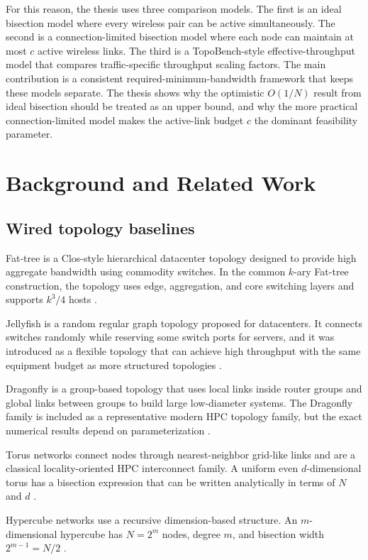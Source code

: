 \documentclass[conference]{IEEEtran}
\begin{document}
For this reason, the thesis uses three comparison models. The first is an ideal bisection model where every wireless pair can be active simultaneously. The second is a connection-limited bisection model where each node can maintain at most \(c\) active wireless links. The third is a TopoBench-style effective-throughput model that compares traffic-specific throughput scaling factors. The main contribution is a consistent required-minimum-bandwidth framework that keeps these models separate. The thesis shows why the optimistic \(O(1/N)\) result from ideal bisection should be treated as an upper bound, and why the more practical connection-limited model makes the active-link budget \(c\) the dominant feasibility parameter.

\section{Background and Related Work}

\subsection{Wired topology baselines}

Fat-tree is a Clos-style hierarchical datacenter topology designed to provide high aggregate bandwidth using commodity switches. In the common \(k\)-ary Fat-tree construction, the topology uses edge, aggregation, and core switching layers and supports \(k^3/4\) hosts \cite{alfares2008}.

Jellyfish is a random regular graph topology proposed for datacenters. It connects switches randomly while reserving some switch ports for servers, and it was introduced as a flexible topology that can achieve high throughput with the same equipment budget as more structured topologies \cite{singla2012}.

Dragonfly is a group-based topology that uses local links inside router groups and global links between groups to build large low-diameter systems. The Dragonfly family is included as a representative modern HPC topology family, but the exact numerical results depend on parameterization \cite{kim2008}.

Torus networks connect nodes through nearest-neighbor grid-like links and are a classical locality-oriented HPC interconnect family. A uniform even \(d\)-dimensional torus has a bisection expression that can be written analytically in terms of \(N\) and \(d\) \cite{aroca2014}.

Hypercube networks use a recursive dimension-based structure. An \(m\)-dimensional hypercube has \(N=2^m\) nodes, degree \(m\), and bisection width \(2^{m-1}=N/2\) \cite{leighton1992}.
\end{document}

